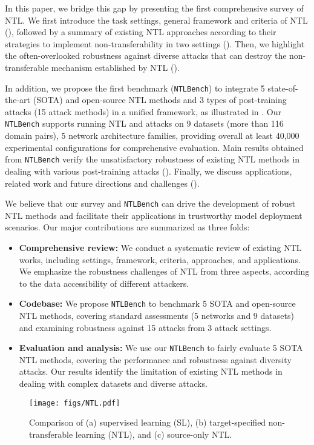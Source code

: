 In this paper, we bridge this gap by presenting the first comprehensive survey of NTL.  We first introduce the task settings, general framework and criteria of NTL (), followed by a summary of existing NTL approaches according to their strategies to implement non-transferability in two settings (). 
Then, we highlight the often-overlooked robustness against diverse attacks that can destroy the non-transferable mechanism established by NTL ().

In addition, we propose the first benchmark (\texttt{NTLBench}) to integrate 5 state-of-the-art (SOTA) and open-source NTL methods and 3 types of post-training attacks (15 attack methods) in a unified framework, as illustrated in . Our \texttt{NTLBench} supports running NTL and attacks on 9 datasets (more than 116 domain pairs), 5 network architecture families,
providing overall at least 40,000 experimental configurations for comprehensive evaluation. 
Main results obtained from \texttt{NTLBench} verify the unsatisfactory robustness of existing NTL methods in dealing with various post-training attacks (). 
Finally, we discuss applications, related work and future directions and challenges (). 


We believe that our survey and \texttt{NTLBench} can drive the development of robust NTL methods and facilitate their applications in trustworthy model deployment scenarios. 
Our major contributions are summarized as three folds:
\begin{itemize}[leftmargin=*, topsep=0pt]\setlength{\parskip}{0pt}
    \item \textbf{Comprehensive review:} We conduct a systematic review of existing NTL works, including settings, framework, criteria, approaches, and applications. We emphasize the robustness challenges of NTL from three aspects, according to the data accessibility of different attackers.
    \item \textbf{Codebase:} We propose \texttt{NTLBench} to benchmark 5 SOTA and open-source NTL methods, covering standard assessments (5 networks and 9 datasets) and examining robustness against 15 attacks from 3 attack settings. 
    \item \textbf{Evaluation and analysis:} We use our \texttt{NTLBench} to fairly evaluate 5 SOTA NTL methods, covering the performance and robustness against diversity attacks. Our results identify the limitation of existing NTL methods in dealing with complex datasets and diverse attacks.
\end{itemize}


\begin{figure}[t!]
    \centering
    \texttt{[image: figs/NTL.pdf]}
    \vspace{-6mm}
    \caption{Comparison of (a) supervised learning (SL), (b) target-specified non-transferable learning (NTL), and (c) source-only NTL.}
    \vspace{-2mm}
    \label{fig:NTL}
\end{figure}

